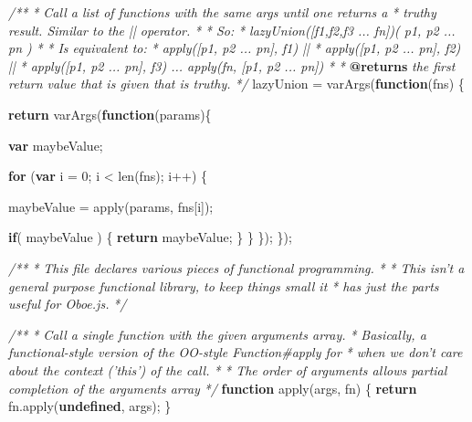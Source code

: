 \documentclass[12pt, ]{article}
\newenvironment{Shaded}{}{}
\newcommand{\KeywordTok}[1]{\textcolor[rgb]{0.00,0.44,0.13}{\textbf{{#1}}}}
\newcommand{\DecValTok}[1]{\textcolor[rgb]{0.25,0.63,0.44}{{#1}}}
\newcommand{\CommentTok}[1]{\textcolor[rgb]{0.38,0.63,0.69}{\textit{{#1}}}}
\newcommand{\OtherTok}[1]{\textcolor[rgb]{0.00,0.44,0.13}{{#1}}}
\newcommand{\FunctionTok}[1]{\textcolor[rgb]{0.02,0.16,0.49}{{#1}}}
\newcommand{\NormalTok}[1]{{#1}}
\begin{document}
\begin{Shaded}
\begin{Highlighting}[]
\CommentTok{/**}
\CommentTok{ * Call a list of functions with the same args until one returns a }
\CommentTok{ * truthy result. Similar to the || operator.}
\CommentTok{ * }
\CommentTok{ * So:}
\CommentTok{ *      lazyUnion([f1,f2,f3 ... fn])( p1, p2 ... pn )}
\CommentTok{ *      }
\CommentTok{ * Is equivalent to: }
\CommentTok{ *      apply([p1, p2 ... pn], f1) || }
\CommentTok{ *      apply([p1, p2 ... pn], f2) || }
\CommentTok{ *      apply([p1, p2 ... pn], f3) ... apply(fn, [p1, p2 ... pn])  }
\CommentTok{ *  }
\CommentTok{ * }\KeywordTok{@returns}\CommentTok{ the first return value that is given that is truthy.}
\CommentTok{ */}
   \NormalTok{lazyUnion = }\FunctionTok{varArgs}\NormalTok{(}\KeywordTok{function}\NormalTok{(fns) \{}

      \KeywordTok{return} \FunctionTok{varArgs}\NormalTok{(}\KeywordTok{function}\NormalTok{(params)\{}
   
         \KeywordTok{var} \NormalTok{maybeValue;}
   
         \KeywordTok{for} \NormalTok{(}\KeywordTok{var} \NormalTok{i = }\DecValTok{0}\NormalTok{; i < }\FunctionTok{len}\NormalTok{(fns); i++) \{}
   
            \NormalTok{maybeValue = }\FunctionTok{apply}\NormalTok{(params, fns[i]);}
   
            \KeywordTok{if}\NormalTok{( maybeValue ) \{}
               \KeywordTok{return} \NormalTok{maybeValue;}
            \NormalTok{\}}
         \NormalTok{\}}
      \NormalTok{\});}
   \NormalTok{\});   }

\CommentTok{/**}
\CommentTok{ * This file declares various pieces of functional programming.}
\CommentTok{ * }
\CommentTok{ * This isn't a general purpose functional library, to keep things small it}
\CommentTok{ * has just the parts useful for Oboe.js.}
\CommentTok{ */}


\CommentTok{/**}
\CommentTok{ * Call a single function with the given arguments array.}
\CommentTok{ * Basically, a functional-style version of the OO-style Function#apply for }
\CommentTok{ * when we don't care about the context ('this') of the call.}
\CommentTok{ * }
\CommentTok{ * The order of arguments allows partial completion of the arguments array}
\CommentTok{ */}
\KeywordTok{function} \FunctionTok{apply}\NormalTok{(args, fn) \{}
   \KeywordTok{return} \OtherTok{fn}\NormalTok{.}\FunctionTok{apply}\NormalTok{(}\KeywordTok{undefined}\NormalTok{, args);}
\NormalTok{\}}


\end{Highlighting}
\end{Shaded}
\end{document}
